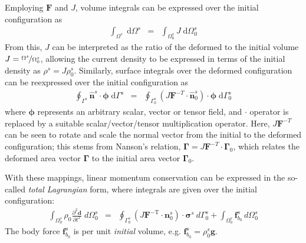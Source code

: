 \documentclass[sn-mathphys,Numbered]{sn-jnl}%
\newcommand{\bb}{\boldsymbol}
\begin{document}
Employing $\bb{F}$ and $J$, volume integrals can be expressed over the initial configuration as
\begin{eqnarray}
    \int_{\Omega^s} \; \text{d}\Omega^s &=& \int_{\Omega_0^s} J \; \text{d}\Omega^s_0
\end{eqnarray}
From this, $J$ can be interpreted as the ratio of the deformed to the initial volume $J = \nicefrac{\Omega^s}{\Omega_0^s}$, allowing the current density to be expressed in terms of the initial density as $\rho^s = J \rho_0^s$.
Similarly, surface integrals over the deformed configuration can be reexpressed over the initial configuration as
\begin{eqnarray}
    \oint_{\Gamma^s} \hat{\bb{n}}^s \cdot \bb{\phi} \; \text{d}\Gamma^s &=&
    \oint_{\Gamma_0^s} \left(J \bb{F}^{-T} \cdot \hat{\bb{n}}_0^s \right) \cdot \bb{\phi} \; \text{d}\Gamma_0^s
\end{eqnarray}
where $\bb{\phi}$ represents an arbitrary scalar, vector or tensor field, and $\cdot$ operator is replaced by a suitable scalar/vector/tensor multiplication operator.
Here, $J \bb{F}^{-T}$ can be seen to rotate and scale the normal vector from the initial to the deformed configuration;
this stems from Nanson's relation, $\bb{\Gamma} = J \bb{F}^{-T} \cdot \bb{\Gamma}_0$, which relates the deformed area vector $\bb{\Gamma}$ to the initial area vector $\bb{\Gamma}_0$. 

With these mappings, linear momentum conservation can be expressed in the so-called \emph{total Lagrangian} form, where integrals are given over the initial configuration:
\begin{eqnarray} \label{eqn:solid_momentum_TL}
    \int_{\Omega_0^s} \rho_0 \frac{\partial^2 \bb{d} }{\partial t^2} \; d\Omega_0^s
    &=&
    \oint_{\Gamma_0^s} \left( J \bb{F}^{-\text{T}} \cdot \bb{n}_0^s \right) \cdot \bb{\sigma}^s \ d\Gamma_0^s
    + \int_{\Omega_0^s}  \bb{f}_{b_0}^s \, d\Omega_0^s
\end{eqnarray}
The body force $\bb{f}_{b_0}^s$ is per unit \emph{initial} volume, e.g. $\bb{f}_{b_0}^s = \rho^s_0 \bb{g}$.

\end{document}
